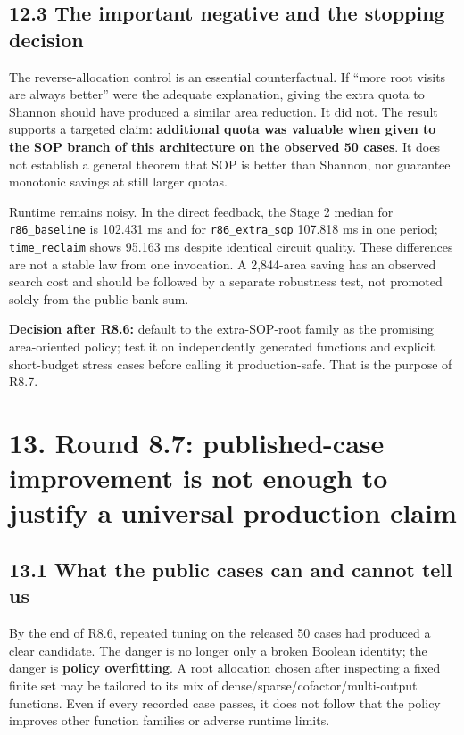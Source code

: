 \subsection{12.3 The important negative and the stopping decision}\label{the-important-negative-and-the-stopping-decision}

The reverse-allocation control is an essential counterfactual. If ``more root visits are always better'' were the adequate explanation, giving the extra quota to Shannon should have produced a similar area reduction. It did not. The result supports a targeted claim: \textbf{additional quota was valuable when given to the SOP branch of this architecture on the observed 50 cases}. It does not establish a general theorem that SOP is better than Shannon, nor guarantee monotonic savings at still larger quotas.

Runtime remains noisy. In the direct feedback, the Stage 2 median for \texttt{r86\_baseline} is 102.431 ms and for \texttt{r86\_extra\_sop} 107.818 ms in one period; \texttt{time\_reclaim} shows 95.163 ms despite identical circuit quality. These differences are not a stable law from one invocation. A 2,844-area saving has an observed search cost and should be followed by a separate robustness test, not promoted solely from the public-bank sum.

\textbf{Decision after R8.6:} default to the extra-SOP-root family as the promising area-oriented policy; test it on independently generated functions and explicit short-budget stress cases before calling it production-safe. That is the purpose of R8.7.

\section{13. Round 8.7: published-case improvement is not enough to justify a universal production claim}\label{round-8.7-published-case-improvement-is-not-enough-to-justify-a-universal-production-claim}

\subsection{13.1 What the public cases can and cannot tell us}\label{what-the-public-cases-can-and-cannot-tell-us}

By the end of R8.6, repeated tuning on the released 50 cases had produced a clear candidate. The danger is no longer only a broken Boolean identity; the danger is \textbf{policy overfitting}. A root allocation chosen after inspecting a fixed finite set may be tailored to its mix of dense/sparse/cofactor/multi-output functions. Even if every recorded case passes, it does not follow that the policy improves other function families or adverse runtime limits.

